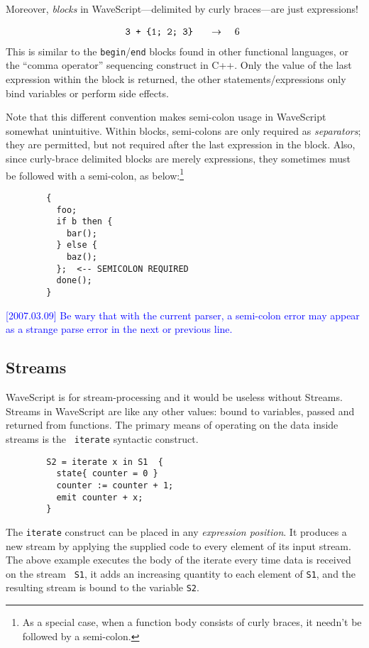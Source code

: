 \documentclass[twocolumn]{report}
\newcommand{\rednote}[1]{{\textcolor{blue}{#1}}}
\newcommand{\evalsto}[2]{\[ \begin{array}{rcl}
$\tt #1 $&$ \arr $&$ #2 $
\end{array} \]}
\newcommand{\arr}{\ensuremath{\rightarrow}}
\begin{document}
Moreover, {\em blocks} in WaveScript---delimited by curly
braces---are just expressions!

\evalsto{3 + \{1; 2; 3\}} {6}
%
This is similar to the {\tt begin}/{\tt end} blocks found in other
functional languages, or the ``comma operator'' sequencing construct
in C++.  Only the value of the last expression within the block is
returned, the other statements/expressions only bind variables or
perform side effects.

Note that this different convention makes semi-colon usage in
WaveScript somewhat unintuitive.  Within blocks, semi-colons are only
required as {\em separators}; they are permitted, but not required
after the last expression in the block.  Also, since curly-brace
delimited blocks are merely expressions, they sometimes must be
followed with a semi-colon, as below:\footnote{As a special case, when
a function body consists of curly braces, it needn't be followed by a semi-colon.}

\begin{verbatim}
        {
          foo;
          if b then {
            bar();
          } else {
            baz();
          };  <-- SEMICOLON REQUIRED
          done();
        }
\end{verbatim}

\rednote{[2007.03.09] Be wary that with the current parser, a
  semi-colon error may appear as a strange parse error in the next
  or previous line.}

\subsection{Streams}

WaveScript is for stream-processing and it would be useless without
Streams.  
Streams in WaveScript are like any other values: bound to variables,
passed and returned from functions.
The primary means of operating on the data inside streams is the {\tt
  iterate} syntactic construct.

\begin{verbatim}
        S2 = iterate x in S1  {
          state{ counter = 0 }
          counter := counter + 1;
          emit counter + x;
        }
\end{verbatim}

The {\tt iterate} construct can be placed in any {\em expression
position}.  It produces a new stream by applying the supplied code to
every element of its input stream.  The above example executes the
body of the iterate every time data is received on the stream {\tt
  S1}, it adds an increasing quantity to each element of {\tt S1}, and the
resulting stream is bound to the variable {\tt S2}.
\end{document}
